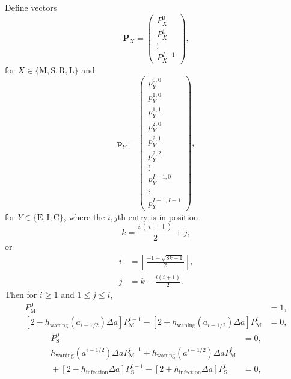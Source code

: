 \documentclass[12pt]{article}
\renewcommand{\vec}[1]{\mathbf{#1}}
\begin{document}
Define vectors
\begin{equation}
  \vec{P}_X =
  \begin{pmatrix}
    P_X^0\\
    P_X^1\\
    \vdots\\
    P_X^{I - 1}
  \end{pmatrix},
\end{equation}
for $X \in \{\mathrm{M}, \mathrm{S}, \mathrm{R}, \mathrm{L}\}$ and
\begin{equation}
  \vec{p}_Y =
  \begin{pmatrix}
    p_Y^{0, 0}\\
    p_Y^{1, 0}\\
    p_Y^{1, 1}\\
    p_Y^{2, 0}\\
    p_Y^{2, 1}\\
    p_Y^{2, 2}\\
    \vdots\\
    p_Y^{I - 1, 0}\\
    \vdots\\
    p_Y^{I - 1, I - 1}
  \end{pmatrix},
\end{equation}
for $Y \in \{\mathrm{E}, \mathrm{I}, \mathrm{C}\}$,
where the $i, j$th entry is in position
\begin{equation}
  k = \frac{i (i + 1)}{2} + j,
\end{equation}
or
\begin{equation}
  \begin{split}
    i &= \left\lfloor\frac{- 1 + \sqrt{8 k + 1}}{2}\right\rfloor,
    \\
    j &= k - \frac{i (i + 1)}{2}.
  \end{split}
\end{equation}
Then for $i \geq 1$ and $1 \leq j \leq i$,
\begin{equation}
  \begin{split}
    P_{\mathrm{M}}^0 &= 1,
    \\
    \left[2 - h_{\text{waning}}(a_{i - 1 / 2}) \Delta a\right]
    P_{\mathrm{M}}^{i - 1}
    - \left[2 + h_{\text{waning}}(a_{i - 1 / 2}) \Delta a\right]
    P_{\mathrm{M}}^i
    &= 0,
  \end{split}
\end{equation}
\begin{equation}
  \begin{split}
    P_{\mathrm{S}}^0 &= 0,
    \\
    h_{\text{waning}}(a^{i - 1 / 2}) \Delta a P_{\mathrm{M}}^{i - 1}
    + h_{\text{waning}}(a^{i - 1 / 2}) \Delta a P_{\mathrm{M}}^i
    \\ {}
    + \left[2 - h_{\text{infection}} \Delta a\right]
    P_{\mathrm{S}}^{i - 1}
    - \left[2 + h_{\text{infection}} \Delta a\right]
    P_{\mathrm{S}}^i
    &= 0,
  \end{split}
\end{equation}
\end{document}

